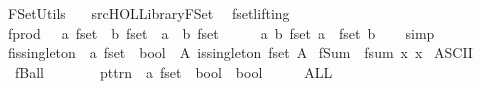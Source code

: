 %
\begin{isabellebody}%
%
%
\isadelimtheory
%
\endisadelimtheory
%
\isatagtheory
{}\isamarkupfalse%
\ FSet{\isacharunderscore}Utils\isanewline
\ \ \ {\isachardoublequoteopen}{\isachartilde}{\isachartilde}{\isacharslash}src{\isacharslash}HOL{\isacharslash}Library{\isacharslash}FSet{\isachardoublequoteclose}\isanewline
{}%
\endisatagtheory
{\isafoldtheory}%
%
\isadelimtheory
\isanewline
%
\endisadelimtheory
\isanewline
{}\isamarkupfalse%
\ \ fset{\isachardot}lifting\ \isanewline
{}\isamarkupfalse%
\ fprod\ \ {\isacharcolon}{\isacharcolon}\ {\isachardoublequoteopen}{\isacharprime}a\ fset\ {\isasymRightarrow}\ {\isacharprime}b\ fset\ {\isasymRightarrow}\ {\isacharparenleft}{\isacharprime}a\ {\isasymtimes}\ {\isacharprime}b{\isacharparenright}\ fset\ {\isachardoublequoteclose}\ {\isacharparenleft}\ {\isachardoublequoteopen}{\isacharbar}{\isasymtimes}{\isacharbar}{\isachardoublequoteclose}\ {}{}{\isacharparenright}\ \ {\isachardoublequoteopen}{\isasymlambda}a\ b{\isachardot}\ fset\ a\ {\isasymtimes}\ fset\ b{\isachardoublequoteclose}\isanewline
%
\isadelimproof
\ \ %
\endisadelimproof
%
\isatagproof
{}\isamarkupfalse%
\ simp%
\endisatagproof
{\isafoldproof}%
%
\isadelimproof
\isanewline
%
\endisadelimproof
\isanewline
{}\isamarkupfalse%
\ fis{\isacharunderscore}singleton\ {\isacharcolon}{\isacharcolon}\ {\isachardoublequoteopen}{\isacharprime}a\ fset\ {\isasymRightarrow}\ bool{\isachardoublequoteclose}\ \ {\isachardoublequoteopen}{\isasymlambda}A{\isachardot}\ is{\isacharunderscore}singleton\ {\isacharparenleft}fset\ A{\isacharparenright}{\isachardoublequoteclose}%
\isadelimproof
%
\endisadelimproof
%
\isatagproof
\isacommand{{\isachardot}}\isamarkupfalse%
%
\endisatagproof
{\isafoldproof}%
%
\isadelimproof
%
\endisadelimproof
\isanewline
{}\isamarkupfalse%
\isanewline
\isanewline
{}\isamarkupfalse%
\ {\isachardoublequoteopen}fSum\ {\isasymequiv}\ fsum\ {\isacharparenleft}{\isasymlambda}x{\isachardot}\ x{\isacharparenright}{\isachardoublequoteclose}\isanewline
\isanewline
{}\isamarkupfalse%
\ {\isacharparenleft}ASCII{\isacharparenright}\isanewline
\ \ {\isachardoublequoteopen}{\isacharunderscore}fBall{\isachardoublequoteclose}\ \ \ \ \ \ \ {\isacharcolon}{\isacharcolon}\ {\isachardoublequoteopen}pttrn\ {\isasymRightarrow}\ {\isacharprime}a\ fset\ {\isasymRightarrow}\ bool\ {\isasymRightarrow}\ bool{\isachardoublequoteclose}\ \ \ \ \ \ {\isacharparenleft}{\isachardoublequoteopen}{\isacharparenleft}{}ALL\ {\isacharparenleft}{\isacharunderscore}{\isacharslash}{\isacharcolon}{\isacharunderscore}{\isacharparenright}{\isachardot}{\isacharslash}\ {\isacharunderscore}{\isacharparenright}{\isachardoublequoteclose}\ {\isacharbrackleft}{}{\isacharcomma}\ {}{\isacharcomma}\ {}{}{\isacharbrackright}\ {}{}{\isacharparenright}\isanewline

\end{isabellebody}

